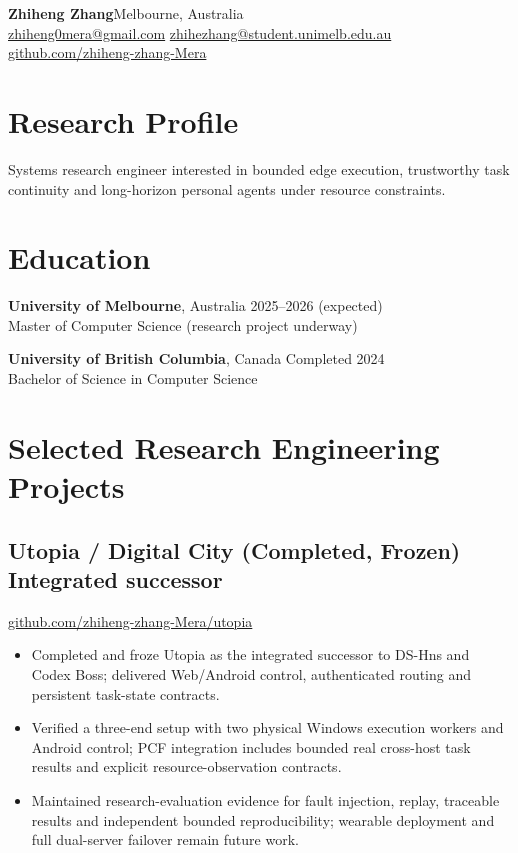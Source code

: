 \documentclass[10pt,a4paper]{article}
\begin{document}
{\LARGE\bfseries Zhiheng Zhang}\hfill Melbourne, Australia\\
\href{mailto:zhiheng0mera@gmail.com}{zhiheng0mera@gmail.com}\quad
\href{mailto:zhihezhang@student.unimelb.edu.au}{zhihezhang@student.unimelb.edu.au}\\
\href{https://github.com/zhiheng-zhang-Mera}{github.com/zhiheng-zhang-Mera}

\section{Research Profile}
Systems research engineer interested in bounded edge execution, trustworthy task continuity and long-horizon personal agents under resource constraints.

\section{Education}
\textbf{University of Melbourne}, Australia \hfill 2025--2026 (expected)\\
Master of Computer Science (research project underway)

\textbf{University of British Columbia}, Canada \hfill Completed 2024\\
Bachelor of Science in Computer Science

\section{Selected Research Engineering Projects}
\subsection*{Utopia / Digital City (Completed, Frozen) \hfill \small Integrated successor}
\href{https://github.com/zhiheng-zhang-Mera/utopia}{github.com/zhiheng-zhang-Mera/utopia}
\begin{itemize}
\item Completed and froze Utopia as the integrated successor to DS-Hns and Codex Boss; delivered Web/Android control, authenticated routing and persistent task-state contracts.
\item Verified a three-end setup with two physical Windows execution workers and Android control; PCF integration includes bounded real cross-host task results and explicit resource-observation contracts.
\item Maintained research-evaluation evidence for fault injection, replay, traceable results and independent bounded reproducibility; wearable deployment and full dual-server failover remain future work.
\end{itemize}
\end{document}
